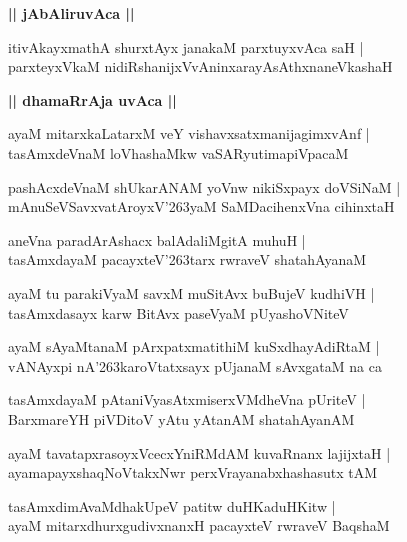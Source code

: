 \documentclass[twoside,12pt,openright]{book}
\def\S{\char'263}
\newcounter{shloka}[chapter]
\def\uvaca#1{\centerline{{\large\textbf{#1}}}}
\begin{document}
\uvaca{|| jAbAliruvAca ||}

\begin{shloka}%
itivAkayxmathA shurxtAyx janakaM parxtuyxvAca saH |\\
parxteyxVkaM nidiRshanijxVvAninxarayAsAthxnaneVkashaH 
\end{shloka}

\uvaca{|| dhamaRrAja uvAca ||}

\begin{shloka}%
ayaM mitarxkaLatarxM veY vishavxsatxmanijagimxvAnf |\\
tasAmxdeVnaM loVhashaMkw vaSARyutimapiVpacaM 
\end{shloka}

\begin{shloka}%
pashAcxdeVnaM shUkarANAM yoVnw nikiSxpayx doVSiNaM |\\
mAnuSeVSavxvatAroyxV\S yaM SaMDacihenxVna cihinxtaH 
\end{shloka}

\begin{shloka}%
aneVna paradArAshacx balAdaliMgitA muhuH |\\
tasAmxdayaM pacayxteV\S tarx rwraveV shatahAyanaM 
\end{shloka}

\begin{shloka}%
ayaM tu parakiVyaM savxM muSitAvx buBujeV kudhiVH |\\
tasAmxdasayx karw BitAvx paseVyaM pUyashoVNiteV 
\end{shloka}

\begin{shloka}%
ayaM sAyaMtanaM pArxpatxmatithiM kuSxdhayAdiRtaM |\\
vANAyxpi nA\S karoVtatxsayx pUjanaM sAvxgataM na ca 
\end{shloka}

\begin{shloka}%
tasAmxdayaM pAtaniVyasAtxmiserxVMdheVna pUriteV |\\
BarxmareYH piVDitoV yAtu yAtanAM shatahAyanAM 
\end{shloka}

\begin{shloka}%
ayaM tavatapxrasoyxVcecxYniRMdAM kuvaRnanx lajijxtaH |\\
ayamapayxshaqNoVtakxNwr perxVrayanabxhashasutx tAM 
\end{shloka}

\begin{shloka}%
tasAmxdimAvaMdhakUpeV patitw duHKaduHKitw |\\
ayaM mitarxdhurxgudivxnanxH pacayxteV rwraveV BaqshaM 
\end{shloka}
\end{document}
